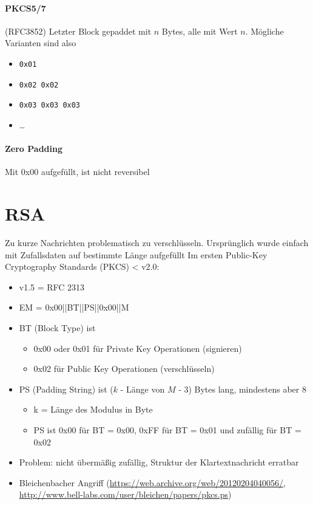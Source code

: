 \paragraph{PKCS5/7} (RFC3852) Letzter Block gepaddet mit $n$ Bytes, alle mit Wert $n$. Mögliche Varianten sind also
\begin{itemize}
    \item \verb|0x01|
    \item \verb|0x02 0x02|
    \item \verb|0x03 0x03 0x03|
    \item \ldots
\end{itemize}

\paragraph{Zero Padding} Mit 0x00 aufgefüllt, ist nicht reversibel

\section{RSA}

Zu kurze Nachrichten problematisch zu verschlüsseln. Ursprünglich wurde einfach mit Zufallsdaten auf bestimmte Länge aufgefüllt
Im ersten Public-Key Cryptography Standards (PKCS) < v2.0:
\begin{itemize}
    \item v1.5 = RFC 2313
    \item EM = 0x00||BT||PS||0x00||M
    \item BT (Block Type) ist
    \begin{itemize}
        \item 0x00 oder 0x01 für Private Key Operationen (signieren)
        \item 0x02 für Public Key Operationen (verschlüsseln)
    \end{itemize}
    \item PS (Padding String) ist ($k$ - Länge von $M$ - 3) Bytes lang, mindestens aber 8
    \begin{itemize}
        \item k = Länge des Modulus in Byte
        \item PS ist 0x00 für BT = 0x00, 0xFF für BT = 0x01 und zufällig für BT = 0x02
    \end{itemize}
    \item Problem: nicht übermäßig zufällig, Struktur der Klartextnachricht erratbar
    \item Bleichenbacher Angriff (\url{https://web.archive.org/web/20120204040056/}, \url{http://www.bell-labs.com/user/bleichen/papers/pkcs.ps})
\end{itemize}

